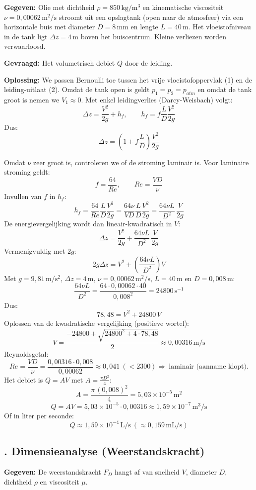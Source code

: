 \documentclass[a4paper,11pt,twoside]{report}
\newcounter{opgave}[section]
\newcommand{\opgave}[1]{%
    \refstepcounter{opgave}%
    \subsection*{\textbf{\arabic{opgave}.} #1}%
}
\begin{document}
                	\textbf{Gegeven:}
Olie met dichtheid $\rho = 850\,\mathrm{kg/m^3}$ en kinematische viscositeit $\nu = 0{,}00062\,\mathrm{m^2/s}$ stroomt uit een opslagtank (open naar de atmosfeer) via een horizontale buis met diameter $D=8\,\mathrm{mm}$ en lengte $L=40\,\mathrm{m}$. Het vloeistofniveau in de tank ligt $\Delta z = 4\,\mathrm{m}$ boven het buiscentrum. Kleine verliezen worden verwaarloosd.

                	\textbf{Gevraagd:}
Het volumetrisch debiet $Q$ door de leiding.

                	\textbf{Oplossing:}
We passen Bernoulli toe tussen het vrije vloeistofoppervlak (1) en de leiding-uitlaat (2).
Omdat de tank open is geldt $p_1=p_2=p_{atm}$ en omdat de tank groot is nemen we $V_1\approx 0$.
Met enkel leidingverlies (Darcy-Weisbach) volgt:
\[
\Delta z = \frac{V^2}{2g} + h_f,\qquad h_f = f\frac{L}{D}\frac{V^2}{2g}
\]
Dus:
\[
\Delta z = \left(1+ f\frac{L}{D}\right)\frac{V^2}{2g}
\]

Omdat $\nu$ zeer groot is, controleren we of de stroming laminair is. Voor laminaire stroming geldt:
\[
f = \frac{64}{Re},\qquad Re = \frac{VD}{\nu}
\]
Invullen van $f$ in $h_f$:
\[
h_f = \frac{64}{Re}\frac{L}{D}\frac{V^2}{2g}
= \frac{64\nu}{VD}\frac{L}{D}\frac{V^2}{2g}
= \frac{64\nu L}{D^2}\,\frac{V}{2g}
\]
De energievergelijking wordt dan lineair-kwadratisch in $V$:
\[
\Delta z = \frac{V^2}{2g} + \frac{64\nu L}{D^2}\,\frac{V}{2g}
\]
Vermenigvuldig met $2g$:
\[
2g\Delta z = V^2 + \left(\frac{64\nu L}{D^2}\right)V
\]
Met $g=9{,}81\,\mathrm{m/s^2}$, $\Delta z=4\,\mathrm{m}$, $\nu=0{,}00062\,\mathrm{m^2/s}$, $L=40\,\mathrm{m}$ en $D=0{,}008\,\mathrm{m}$:
\[
\frac{64\nu L}{D^2} = \frac{64\cdot 0{,}00062\cdot 40}{0{,}008^2} = 24800\,\mathrm{s^{-1}}
\]
Dus:
\[
78{,}48 = V^2 + 24800\,V
\]
Oplossen van de kwadratische vergelijking (positieve wortel):
\[
V = \frac{-24800 + \sqrt{24800^2 + 4\cdot 78{,}48}}{2} \approx 0{,}00316\,\mathrm{m/s}
\]
Reynoldsgetal:
\[
Re = \frac{VD}{\nu} = \frac{0{,}00316\cdot 0{,}008}{0{,}00062} \approx 0{,}041\ (<2300)\Rightarrow\ \text{laminair (aanname klopt).}
\]
Het debiet is $Q = AV$ met $A = \frac{\pi D^2}{4}$:
\[
A = \frac{\pi\,(0{,}008)^2}{4} = 5{,}03\times 10^{-5}\,\mathrm{m^2}
\]
\[
Q = AV = 5{,}03\times 10^{-5}\cdot 0{,}00316 \approx 1{,}59\times 10^{-7}\,\mathrm{m^3/s}
\]
Of in liter per seconde:
\[
Q \approx 1{,}59\times 10^{-4}\,\mathrm{L/s}\ (\approx 0{,}159\,\mathrm{mL/s})
\]

\opgave{Dimensieanalyse (Weerstandskracht)}
\textbf{Gegeven:}
De weerstandskracht $F_D$ hangt af van snelheid $V$, diameter $D$, dichtheid $\rho$ en viscositeit $\mu$.
\end{document}
